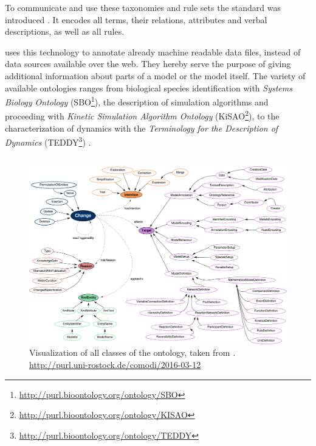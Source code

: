 	To communicate and use these taxonomies and rule sets the \owl standard was introduced \citep{Bechhofer2004,Bechhofer2009}. It encodes all terms, their relations, attributes and verbal descriptions, as well as all rules.
	
	\sysbio uses this technology to annotate already machine readable data files, instead of data sources available over the web. They hereby serve the purpose of giving additional information about parts of a model or the model itself. The variety of available ontologies ranges from biological species identification with \emph{Systems Biology Ontology} (SBO\footnote{\url{http://purl.bioontology.org/ontology/SBO}}), the description of simulation algorithms and proceeding with \emph{Kinetic Simulation Algorithm Ontology} (KiSAO\footnote{\url{http://purl.bioontology.org/ontology/KISAO}}), to the characterization of dynamics with the \emph{Terminology for the Description of Dynamics} (TEDDY\footnote{\url{http://purl.bioontology.org/ontology/TEDDY}}) \citep{Courtot2011}.
	

	
	\subsection{\comodi}
	\label{sec:background:onto:comodi}
	
	\begin{figure}[h]
		\centering
		\includegraphics[width=\textwidth,keepaspectratio]{resources/comodi-overview.pdf}
		\caption[Visualisation of \comodi]{Visualization of all classes of the \comodi ontology, taken from \citealt{Scharm2016}. \url{http://purl.uni-rostock.de/comodi/2016-03-12}}
		\label{fig:background:onto:comodi}
	\end{figure}
	
